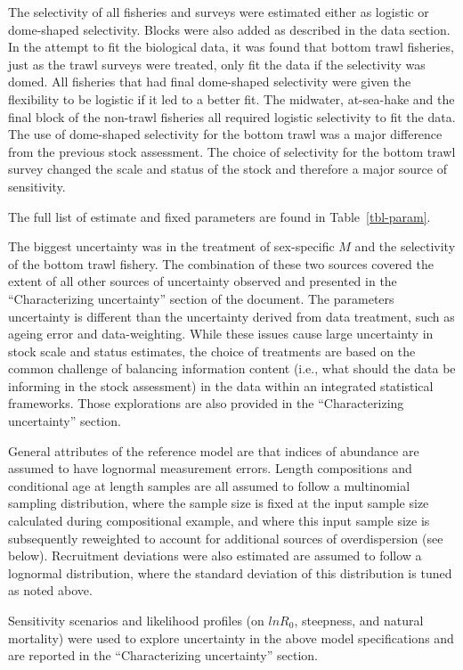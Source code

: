 \documentclass[
]{scrartcl}
\begin{document}
The selectivity of all fisheries and surveys were estimated either as
logistic or dome-shaped selectivity. Blocks were also added as described
in the data section. In the attempt to fit the biological data, it was
found that bottom trawl fisheries, just as the trawl surveys were
treated, only fit the data if the selectivity was domed. All fisheries
that had final dome-shaped selectivity were given the flexibility to be
logistic if it led to a better fit. The midwater, at-sea-hake and the
final block of the non-trawl fisheries all required logistic selectivity
to fit the data. The use of dome-shaped selectivity for the bottom trawl
was a major difference from the previous stock assessment. The choice of
selectivity for the bottom trawl survey changed the scale and status of
the stock and therefore a major source of sensitivity.

The full list of estimate and fixed parameters are found in
Table~\ref{tbl-param}.

The biggest uncertainty was in the treatment of sex-specific \(M\) and
the selectivity of the bottom trawl fishery. The combination of these
two sources covered the extent of all other sources of uncertainty
observed and presented in the ``Characterizing uncertainty'' section of
the document. The parameters uncertainty is different than the
uncertainty derived from data treatment, such as ageing error and
data-weighting. While these issues cause large uncertainty in stock
scale and status estimates, the choice of treatments are based on the
common challenge of balancing information content (i.e., what should the
data be informing in the stock assessment) in the data within an
integrated statistical frameworks. Those explorations are also provided
in the ``Characterizing uncertainty'' section.

General attributes of the reference model are that indices of abundance
are assumed to have lognormal measurement errors. Length compositions
and conditional age at length samples are all assumed to follow a
multinomial sampling distribution, where the sample size is fixed at the
input sample size calculated during compositional example, and where
this input sample size is subsequently reweighted to account for
additional sources of overdispersion (see below). Recruitment deviations
were also estimated are assumed to follow a lognormal distribution,
where the standard deviation of this distribution is tuned as noted
above.

Sensitivity scenarios and likelihood profiles (on \(lnR_0\), steepness,
and natural mortality) were used to explore uncertainty in the above
model specifications and are reported in the ``Characterizing
uncertainty'' section.
\end{document}
